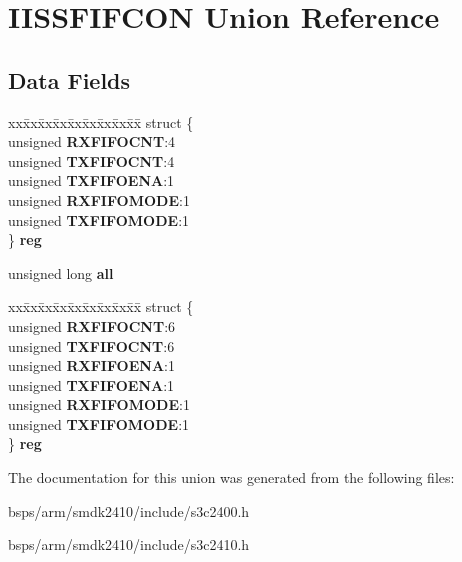 \hypertarget{unionIISSFIFCON}{}\section{I\+I\+S\+S\+F\+I\+F\+C\+ON Union Reference}
\label{unionIISSFIFCON}
\subsection*{Data Fields}
\begin{DoxyCompactItemize}
\item 
\mbox{\label{unionIISSFIFCON_ae4d4fe3dc6b4cf0b48b00b91eb102175}} 
\begin{tabbing}
xx\=xx\=xx\=xx\=xx\=xx\=xx\=xx\=xx\=\kill
struct \{\\
\>unsigned {\bfseries RXFIFOCNT}:4\\
\>unsigned {\bfseries TXFIFOCNT}:4\\
\>unsigned {\bfseries TXFIFOENA}:1\\
\>unsigned {\bfseries RXFIFOMODE}:1\\
\>unsigned {\bfseries TXFIFOMODE}:1\\
\} {\bfseries reg}\\

\end{tabbing}\item 
\mbox{\label{unionIISSFIFCON_ad2a1290a02efc429563f1814d9ff1994}} 
unsigned long {\bfseries all}
\item 
\mbox{\label{unionIISSFIFCON_a1aa1c103ed2f62cbd0e53c4edfa026a6}} 
\begin{tabbing}
xx\=xx\=xx\=xx\=xx\=xx\=xx\=xx\=xx\=\kill
struct \{\\
\>unsigned {\bfseries RXFIFOCNT}:6\\
\>unsigned {\bfseries TXFIFOCNT}:6\\
\>unsigned {\bfseries RXFIFOENA}:1\\
\>unsigned {\bfseries TXFIFOENA}:1\\
\>unsigned {\bfseries RXFIFOMODE}:1\\
\>unsigned {\bfseries TXFIFOMODE}:1\\
\} {\bfseries reg}\\

\end{tabbing}\end{DoxyCompactItemize}


The documentation for this union was generated from the following files\+:\begin{DoxyCompactItemize}
\item 
bsps/arm/smdk2410/include/s3c2400.\+h\item 
bsps/arm/smdk2410/include/s3c2410.\+h\end{DoxyCompactItemize}
